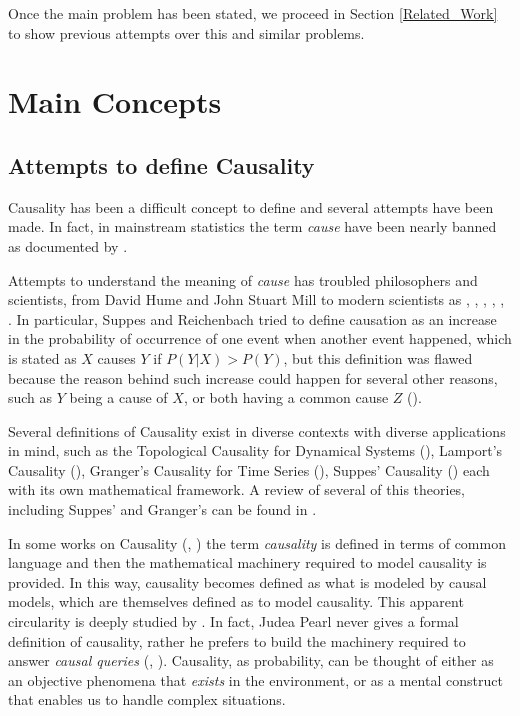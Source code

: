 \documentclass[english,letterpaper,12pt,final]{article}
\theoremstyle{definition}
\begin{document}
Once the main problem has been stated, we proceed in Section \ref{Related_Work} to show previous attempts over this and similar problems. 

\newpage
\section{Main Concepts}{\label{Main_Concepts}}
	\subsection{Attempts to define Causality}
	Causality has been a difficult concept to define and several attempts have been made. In fact, in mainstream statistics the term \textit{cause} have been nearly banned as documented by \cite{pearl2018why}.
	
Attempts to understand the meaning of \textit{cause} has troubled philosophers and scientists, from David Hume and John Stuart Mill to modern scientists as \cite{suppes1970probabilistic}, \cite{cartwright1983laws}, \cite{spirtes2000causation}, \cite{pearl2009causality}, \cite{spohn2012laws}, \cite{sep-causation-probabilistic}. In particular, Suppes and Reichenbach tried to define causation as an increase in the probability of occurrence of one event when another event happened, which is stated as $X$ causes $Y$ if $P(Y|X) > P(Y)$, but this definition was flawed because the reason behind such increase could happen for several other reasons, such as $Y$ being a cause of $X$, or both having a common cause $Z$ (\cite{pearl2018why}).

Several definitions of Causality exist in diverse contexts with diverse applications in mind, such as the Topological Causality for Dynamical Systems (\cite{harnack2017topological}), Lamport's Causality (\cite{lamport1978time}), Granger's Causality for Time Series (\cite{granger1969investigating}), Suppes' Causality (\cite{suppes1970probabilistic}) each with its own mathematical framework. A review of several of this theories, including Suppes' and Granger's can be found in \cite{holland1985statistics}.
	
In some works on Causality (\cite{spirtes2000causation}, \cite{pearl2009causality}) the term \textit{causality} is defined in terms of common language and then the mathematical machinery required to model causality is provided. In this way, causality becomes defined as what is modeled by causal models, which are themselves defined as to model causality. This apparent circularity is deeply studied by \cite{woodward2005making}. In fact, Judea Pearl never gives a formal definition of causality, rather he prefers to build the machinery required to answer \textit{causal queries} (\cite{pearl2009causality}, \cite{pearl2018theoretical}). Causality, as probability, can be thought of either as an objective phenomena that \textit{exists} in the environment, or as a mental construct that enables us to handle complex situations.
	
\end{document}
